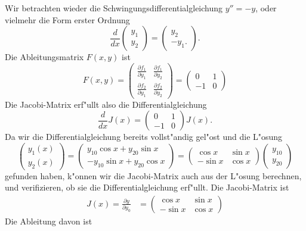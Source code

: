 \begin{beispiel}
Wir betrachten wieder die Schwingungsdifferentialgleichung $y''=-y$,
oder vielmehr die Form erster Ordnung
\[
\frac{d}{dx}\begin{pmatrix}y_1\\y_2\end{pmatrix}
=
\begin{pmatrix}
y_2\\-y_1.
\end{pmatrix}.
\]
Die Ableitungsmatrix $F(x,y)$ ist
\[
F(x,y)
=
\begin{pmatrix}
\displaystyle\frac{\partial f_1}{\partial y_1}&\displaystyle\frac{\partial f_1}{\partial y_2}\\
\displaystyle\frac{\partial f_2}{\partial y_1}&\displaystyle\frac{\partial f_2}{\partial y_2}
\end{pmatrix}
=
\begin{pmatrix}
 0&1\\
-1&0
\end{pmatrix}
\]
Die Jacobi-Matrix erf"ullt also die Differentialgleichung
\[
\frac{d}{dx}J(x)=\begin{pmatrix}0&1\\-1&0\end{pmatrix}J(x).
\]
Da wir die Differentialgleichung bereits vollst"andig gel"ost und
die L"osung
\[
\begin{pmatrix}
y_1(x)\\y_2(x)
\end{pmatrix}
=
\begin{pmatrix}
 y_{10}\cos x+y_{20}\sin x\\
-y_{10}\sin x+y_{20}\cos x
\end{pmatrix}
=
\begin{pmatrix}
 \cos x&\sin x\\
-\sin x&\cos x
\end{pmatrix}
\begin{pmatrix}y_{10}\\y_{20}\end{pmatrix}
\]
gefunden haben, k"onnen wir die Jacobi-Matrix auch aus der L"osung berechnen,
und verifizieren, ob sie die Differentialgleichung erf"ullt.
Die Jacobi-Matrix ist
\begin{align*}
J(x)
=
\frac{\partial y}{\partial y_0}
&=
\begin{pmatrix}
 \cos x&\sin x\\
-\sin x&\cos x
\end{pmatrix}
\end{align*}
Die Ableitung davon ist

\end{beispiel}
